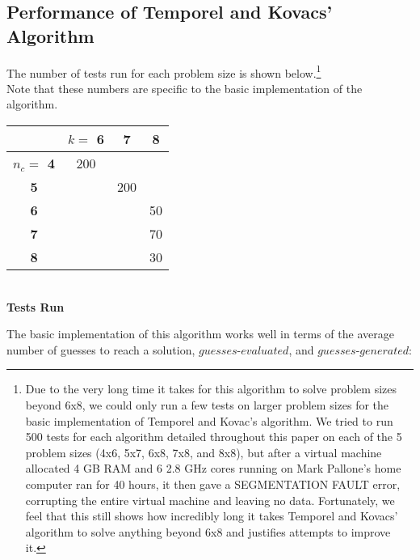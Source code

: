 \documentclass[11pt,twocolumn]{article}
\begin{document}
\subsection{Performance of Temporel and Kovacs' Algorithm}

The number of tests run for each problem size is shown below.\footnote{Due to the very long time it takes for this algorithm to solve problem sizes beyond 6x8, we could only run a few tests on larger problem sizes for the basic implementation of Temporel and Kovac's algorithm. We tried to run 500 tests for each algorithm detailed throughout this paper on each of the 5 problem sizes (4x6, 5x7, 6x8, 7x8, and 8x8), but after a virtual machine allocated 4 GB RAM and 6 2.8 GHz cores running on Mark Pallone's home computer ran for 40 hours, it then gave a SEGMENTATION FAULT error, corrupting the entire virtual machine and leaving no data. Fortunately, we feel that this still shows how incredibly long it takes Temporel and Kovacs' algorithm to solve anything beyond 6x8 and justifies attempts to improve it.}\\ 

Note that these numbers are specific to the basic implementation of the algorithm.

\begin{center}
\begin{tabular}{|c|c|c|c|}
\hline
        & \bf $k= $ 6 &\bf 7 &\bf 8 \\
\hline
\bf $n_c = $ 4 & 200   &   &   \\
\hline
\bf 5       &       &200&   \\
\hline
\bf 6       &       &   &50 \\
\hline
\bf 7       &       &   &70 \\
\hline
\bf 8       &       &   &30 \\
\hline
\end{tabular}\\
\bf Tests Run\rm\\
\end{center}

The basic implementation of this algorithm works well in terms of the average number of guesses to reach a solution, $guesses$-$evaluated$, and $guesses$-$generated$:
\end{document}
